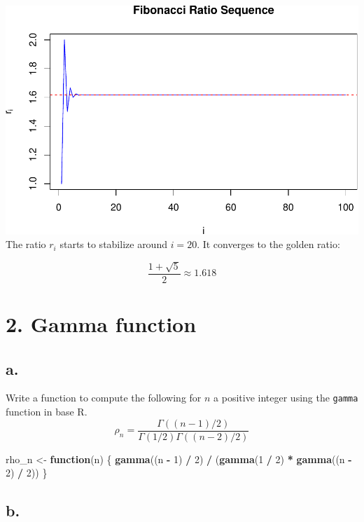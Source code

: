 \documentclass[
]{article}
\newenvironment{Shaded}{\begin{snugshade}}{\end{snugshade}}
\newcommand{\ControlFlowTok}[1]{\textcolor[rgb]{0.13,0.29,0.53}{\textbf{#1}}}
\newcommand{\DecValTok}[1]{\textcolor[rgb]{0.00,0.00,0.81}{#1}}
\newcommand{\FunctionTok}[1]{\textcolor[rgb]{0.13,0.29,0.53}{\textbf{#1}}}
\newcommand{\NormalTok}[1]{#1}
\newcommand{\OtherTok}[1]{\textcolor[rgb]{0.56,0.35,0.01}{#1}}
\newcommand{\SpecialCharTok}[1]{\textcolor[rgb]{0.81,0.36,0.00}{\textbf{#1}}}
\begin{document}
\includegraphics{CS1_files/figure-latex/unnamed-chunk-4-1.pdf} The ratio
\(r_i\) starts to stabilize around \(i = 20\). It converges to the
golden ratio:

\[
\frac{1 + \sqrt{5}}{2} \approx 1.618
\]

\section{2. Gamma function}\label{gamma-function}

\subsection{a.}\label{a.-1}

Write a function to compute the following for \(n\) a positive integer
using the \texttt{gamma} function in base R. \[
\rho_n =\frac{\Gamma((n-1)/2)}{\Gamma(1/2)\Gamma((n - 2)/2)}
\]

\begin{Shaded}
\begin{Highlighting}[]
\NormalTok{rho\_n }\OtherTok{\textless{}{-}} \ControlFlowTok{function}\NormalTok{(n) \{}
  \FunctionTok{gamma}\NormalTok{((n }\SpecialCharTok{{-}} \DecValTok{1}\NormalTok{) }\SpecialCharTok{/} \DecValTok{2}\NormalTok{) }\SpecialCharTok{/}\NormalTok{ (}\FunctionTok{gamma}\NormalTok{(}\DecValTok{1} \SpecialCharTok{/} \DecValTok{2}\NormalTok{) }\SpecialCharTok{*} \FunctionTok{gamma}\NormalTok{((n }\SpecialCharTok{{-}} \DecValTok{2}\NormalTok{) }\SpecialCharTok{/} \DecValTok{2}\NormalTok{))}
\NormalTok{\}}
\end{Highlighting}
\end{Shaded}

\subsection{b.}\label{b.-1}
\end{document}
